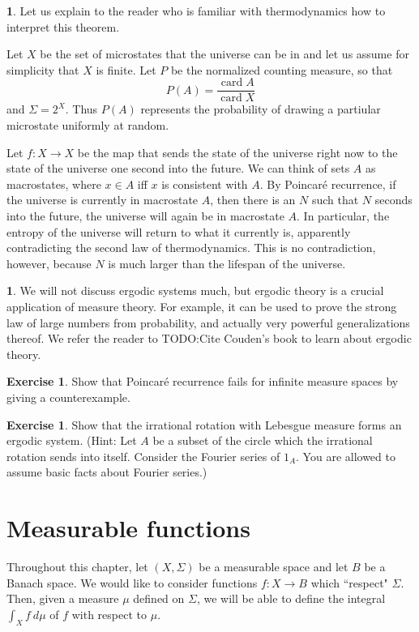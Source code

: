 \documentclass[12pt]{book}
\DeclareMathOperator{\card}{card}
\theoremstyle{definition}
\newtheorem{subsec}[theorem]{}
\newtheorem{exercise}[theorem]{Exercise}
\begin{document}
\begin{subsec}
Let us explain to the reader who is familiar with thermodynamics how to interpret this theorem.

Let $X$ be the set of microstates that the universe can be in and let us assume for simplicity that $X$ is finite.
Let $P$ be the normalized counting measure, so that
$$P(A) = \frac{\card A}{\card X}$$
and $\Sigma = 2^X$.
Thus $P(A)$ represents the probability of drawing a partiular microstate uniformly at random.

Let $f: X \to X$ be the map that sends the state of the universe right now to the state of the universe one second into the future.
We can think of sets $A$ as macrostates, where $x \in A$ iff $x$ is consistent with $A$.
By Poincar\'e recurrence, if the universe is currently in macrostate $A$, then there is an $N$ such that $N$ seconds into the future, the universe will again be in macrostate $A$.
In particular, the entropy of the universe will return to what it currently is, apparently contradicting the second law of thermodynamics.
This is no contradiction, however, because $N$ is much larger than the lifespan of the universe.
\end{subsec}

\begin{subsec}
We will not discuss ergodic systems much, but ergodic theory is a crucial application of measure theory.
For example, it can be used to prove the strong law of large numbers from probability, and actually very powerful generalizations thereof.
We refer the reader to TODO:Cite Couden's book to learn about ergodic theory.
\end{subsec}

\begin{exercise}
Show that Poincar\'e recurrence fails for infinite measure spaces by giving a counterexample.
\end{exercise}

\begin{exercise}
\label{irrational rotation exercise}
Show that the irrational rotation with Lebesgue measure forms an ergodic system.
(Hint: Let $A$ be a subset of the circle which the irrational rotation sends into itself. Consider the Fourier series of $1_A$. You are allowed to assume basic facts about Fourier series.)
\end{exercise}


\chapter{Measurable functions}
Throughout this chapter, let $(X, \Sigma)$ be a measurable space and let $B$ be a Banach space.
We would like to consider functions $f: X \to B$ which ``respect" $\Sigma$. Then, given a measure $\mu$ defined on $\Sigma$, we will be able to define the integral $\int_X f~d\mu$ of $f$ with respect to $\mu$.
\end{document}
